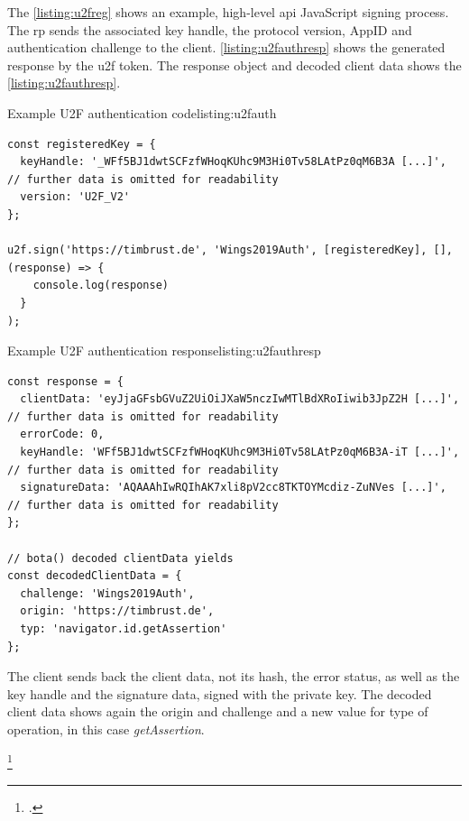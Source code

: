 The \autoref{listing:u2freg} shows an example, high-level \gls{api} JavaScript signing process. The \gls{rp} sends the associated key handle, the protocol version, AppID and authentication challenge to the client. \autoref{listing:u2fauthresp} shows the generated response by the \gls{u2f} token. The response object and decoded client data shows the \autoref{listing:u2fauthresp}.
\\
\begin{example}{Example U2F authentication code}{listing:u2fauth}
\begin{verbatim}
const registeredKey = {
  keyHandle: '_WFf5BJ1dwtSCFzfWHoqKUhc9M3Hi0Tv58LAtPz0qM6B3A [...]', // further data is omitted for readability
  version: 'U2F_V2'
};

u2f.sign('https://timbrust.de', 'Wings2019Auth', [registeredKey], [], (response) => {
    console.log(response)
  }
);
\end{verbatim}
\end{example}

\begin{example}{Example U2F authentication response}{listing:u2fauthresp}
\begin{verbatim}
const response = {
  clientData: 'eyJjaGFsbGVuZ2UiOiJXaW5nczIwMTlBdXRoIiwib3JpZ2H [...]', // further data is omitted for readability
  errorCode: 0,
  keyHandle: 'WFf5BJ1dwtSCFzfWHoqKUhc9M3Hi0Tv58LAtPz0qM6B3A-iT [...]', // further data is omitted for readability
  signatureData: 'AQAAAhIwRQIhAK7xli8pV2cc8TKTOYMcdiz-ZuNVes [...]', // further data is omitted for readability
};

// bota() decoded clientData yields
const decodedClientData = {
  challenge: 'Wings2019Auth',
  origin: 'https://timbrust.de',
  typ: 'navigator.id.getAssertion'
};
\end{verbatim}
\end{example}

The client sends back the client data, not its hash, the error status, as well as the key handle and the signature data, signed with the private key. The decoded client data shows again the origin and challenge and a new value for type of operation, in this case \textit{getAssertion}.

\footcites[See][1--2, 4]{u2f-overview}[See][4]{u2f-js-api}